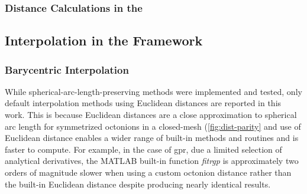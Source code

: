 \documentclass[preprint,12pt]{elsarticle}
\begin{document}
\subsubsection{Distance Calculations in the }
\label{sec:methods:distancepFZ}


\subsection{Interpolation in the  Framework}
\label{sec:methods:interpolation}

\subsubsection{Barycentric Interpolation}
\label{sec:methods:bary}



While spherical-arc-length-preserving methods were implemented and tested, only default interpolation methods using Euclidean distances are reported in this work. This is because Euclidean distances are a close approximation to spherical arc length for symmetrized octonions in a closed-mesh (\cref{fig:dist-parity} and use of Euclidean distance enables a wider range of built-in methods and routines and is faster to compute. For example, in the case of \gls{gpr}, due a limited selection of analytical derivatives, the MATLAB built-in function \textit{fitrgp} is approximately two orders of magnitude slower when using a custom octonion distance rather than the built-in Euclidean distance despite producing nearly identical results.
\end{document}

